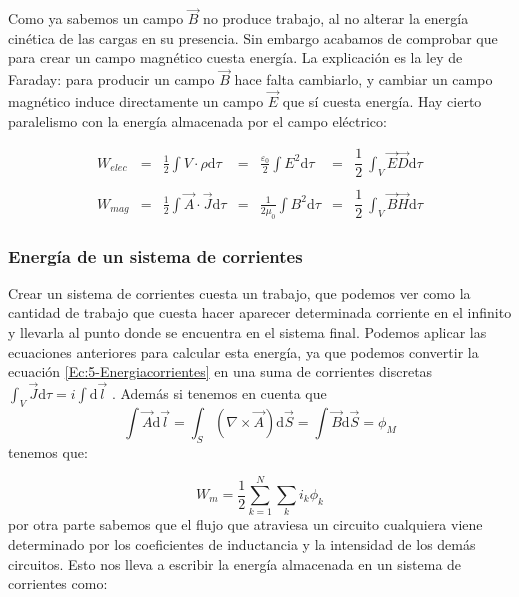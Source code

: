 \documentclass[12pt]{article}
\newcommand{\D}{\mathrm{d}}
\begin{document}
Como ya sabemos un campo $\vec{B}$ no produce trabajo, al no alterar la energía cinética de las cargas en su presencia. Sin embargo acabamos de comprobar que para crear un campo magnético cuesta energía. La explicación es la ley de Faraday: para producir un campo $\vec{B}$ hace falta cambiarlo, y cambiar un campo magnético induce directamente un campo $\vec{E}$ que sí cuesta energía. Hay cierto paralelismo con la energía almacenada por el campo eléctrico:

\begin{equation}
\begin{array}{lllllll}

W_{elec} & =  & \frac{1}{2} \int V \cdot \rho \D \tau & = & \frac{\varepsilon_0}{2} \int E^2 \D \tau & = & \dfrac{1}{2} \ \int_V \vec{E} \vec{D} \D \tau \\ \\

W_{mag} & = & \frac{1}{2} \int \vec{A} \cdot \vec{J} \D \tau & = & \frac{1}{2\mu_0} \int B^2 \D \tau & = & \dfrac{1}{2} \ \int_V \vec{B} \vec{H} \D \tau

\end{array}
\end{equation}

\subsubsection{Energía de un sistema de corrientes}

Crear un sistema de corrientes cuesta un trabajo, que podemos ver como la cantidad de trabajo que cuesta hacer aparecer determinada corriente en el infinito y llevarla al punto donde se encuentra en el sistema final. Podemos aplicar las ecuaciones anteriores para calcular esta energía, ya que podemos convertir la ecuación \ref{Ec:5-Energiacorrientes} en una suma de corrientes discretas $\int_V \vec{J} \D \tau = i \int \D \vec{l}$ . Además si tenemos en cuenta que $$ \int \vec{A} \D \vec{l} =\int_S (\nabla \times \vec{A})\D \vec{S} = \int \vec{B} \D \vec{S}  = \phi_M$$tenemos que: 

\begin{equation}
W_m = \dfrac{1}{2} \sum_{k=1}^N \sum_k i_k \phi_k
\end{equation}
por otra parte sabemos que el flujo que atraviesa un circuito cualquiera viene determinado por los coeficientes de inductancia y la intensidad de los demás circuitos. Esto nos lleva a escribir la energía almacenada en un sistema de corrientes como:
\end{document}
